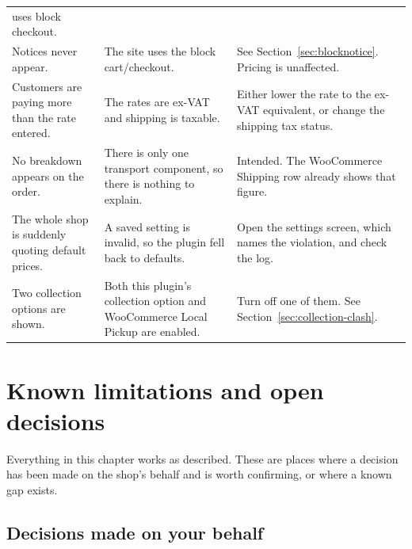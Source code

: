 \documentclass[11pt,a4paper,oneside]{report}
\begin{document}
\begin{longtable}{@{}L{4.6cm}L{4.8cm}L{5.4cm}@{}}
uses block checkout.\\
\addlinespace
Notices never appear. &
The site uses the block cart/checkout. &
See Section~\ref{sec:blocknotice}. Pricing is unaffected.\\
\addlinespace
Customers are paying more than the rate entered. &
The rates are ex-VAT and shipping is taxable. &
Either lower the rate to the ex-VAT equivalent, or change the shipping tax status.\\
\addlinespace
No breakdown appears on the order. &
There is only one transport component, so there is nothing to explain. &
Intended. The WooCommerce \textsf{Shipping} row already shows that figure.\\
\addlinespace
The whole shop is suddenly quoting default prices. &
A saved setting is invalid, so the plugin fell back to defaults. &
Open the settings screen, which names the violation, and check the log.\\
\addlinespace
Two collection options are shown. &
Both this plugin's collection option and WooCommerce Local Pickup are enabled. &
Turn off one of them. See Section~\ref{sec:collection-clash}.\\
\bottomrule
\end{longtable}

\chapter{Known limitations and open decisions}
\label{ch:limits}

Everything in this chapter works as described. These are places where a decision
has been made on the shop's behalf and is worth confirming, or where a known gap
exists.

\section{Decisions made on your behalf}
\end{document}

